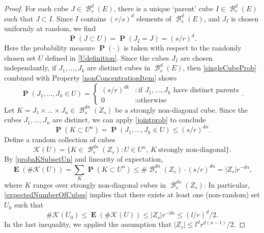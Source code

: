 \documentclass[dvipsnames,letterpaper,12pt]{article}
\numberwithin{equation}{section}
\theoremstyle{plain}
\DeclareMathOperator{\Prob}{\mathbf{P}}
\DeclareMathOperator{\Expect}{\mathbf{E}}
\DeclareMathOperator{\B}{\mathcal{B}}
\begin{document}
\begin{proof}
	For each cube $J \in \B_s^d(E)$, there is a unique `parent' cube $I \in \B_r^d(E)$ such that $J \subset I$. Since $I$ contains $(r/s)^d$ elements of $\B^d_s(E)$, and $J_I$ is chosen uniformly at random, we find
	\begin{equation} \label{singleCubeProb}
		\Prob(J \subset U) = \Prob(J_I = J) = (s/r)^d.
	\end{equation}
	Here the probability measure $\Prob(\cdot)$ is taken with respect to the randomly chosen set $U$ defined in \eqref{Udefinition}. Since the cubes $J_I$ are chosen independantly, if $J_1, \dots, J_k$ are distinct cubes in $\B^d_s(E)$, then \eqref{singleCubeProb} combined with Property \ref{nonConcentrationItem} shows
	\begin{equation}\label{jointprob}
		\Prob(J_1, \dots, J_k \in U) = \begin{cases} (s/r)^{dk} &: \text{if $J_1, \dots, J_k$ have distinct parents} \\ 0 &: \text{otherwise} \end{cases}.
	\end{equation}
	Let $K = J_1 \times \dots \times J_n \in \B^{dn}_s(Z_s)$ be a strongly non-diagonal cube. Since the cubes $J_1, \dots, J_n$ are distinct, we can apply \eqref{jointprob} to conclude
	\begin{equation}\label{probaKSubsetUn}
		\Prob(K \subset U^n) = \Prob(J_1, \dots, J_k \in U) \leq (s/r)^{dn}.
	\end{equation}
	Define a random collection of cubes
	\[
		\mathcal{K}(U)=\{ K \in \B_s^{dn}(Z_s) \colon U\in U^n,\ K\ \textrm{strongly non-diagonal}  \}.
	\]
	By \eqref{probaKSubsetUn} and linearity of expectation,
	\begin{equation}\label{expectedNumberOfCubes}
		\Expect(\# \mathcal{K}(U)) = \sum_K \Prob(K \subset U^n) \leq \# \B_s^{dn}(Z_s) \cdot (s/r)^{dn} = |Z_s| r^{-dn},
	\end{equation}
	where $K$ ranges over strongly non-diagonal cubes in $\B^{dn}_s(Z_s)$. In particular, \eqref{expectedNumberOfCubes} implies that there exists at least one (non-random) set $U_0$ such that
	\begin{equation}\label{KU0Small}
		\# \mathcal{K}(U_0) \leq \Expect(\# \mathcal{K}(U)) \leq |Z_s| r^{-dn} \leq (l/r)^d/2.
	\end{equation}
	In the last inequality, we applied the assumption that $|Z_s| \leq l^d r^{d(n-1)}/2$.


\end{proof}
\end{document}
